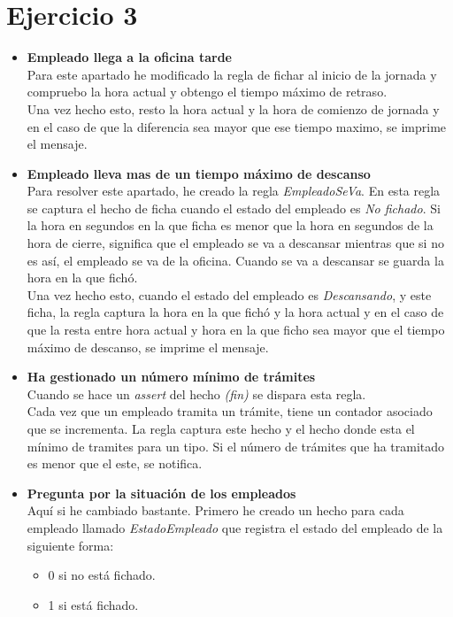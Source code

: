 \documentclass[10pt,spanish]{article}
\begin{document}
	\section{Ejercicio 3}
	\begin{itemize}
		\item \textbf{Empleado llega a la oficina tarde}\\
		Para este apartado he modificado la regla de fichar al inicio de la jornada y compruebo la hora actual y obtengo el tiempo máximo de retraso.\\
		Una vez hecho esto, resto la hora actual y la hora de comienzo de jornada y en el caso de que la diferencia sea mayor que ese tiempo maximo, se imprime el mensaje.
		\item \textbf{Empleado lleva mas de un tiempo máximo de descanso}\\
		Para resolver este apartado, he creado la regla \textit{EmpleadoSeVa}. En esta regla se captura el hecho de ficha cuando el estado del empleado es \textit{No fichado}.
		Si la hora en segundos en la que ficha es menor que la hora en segundos de la hora de cierre, significa que el empleado se va a descansar mientras que si no es así, el empleado se va de la oficina. Cuando se va a descansar se guarda la hora en la que fichó.
		\\Una vez hecho esto, cuando el estado del empleado es \textit{Descansando}, y este ficha, la regla captura la hora en la que fichó y la hora actual y en el caso de que la resta entre hora actual y hora en la que ficho sea mayor que el tiempo máximo de descanso, se imprime el mensaje.
		\item \textbf{Ha gestionado un número mínimo de trámites}\\
		Cuando se hace un \textit{assert} del hecho \textit{(fin)} se dispara esta regla.\\
		Cada vez que un empleado tramita un trámite, tiene un contador asociado que se incrementa.
		La regla captura este hecho y el hecho donde esta el mínimo de tramites para un tipo. Si el número de trámites que ha tramitado es menor que el este, se notifica.
		\item \textbf{Pregunta por la situación de los empleados}\\
		Aquí si he cambiado bastante. Primero he creado un hecho para cada empleado llamado \textit{EstadoEmpleado} que registra el estado del empleado de la siguiente forma:
		\begin{itemize}
			\item 0 si no está fichado.
			\item 1 si está fichado.

\end{itemize}
\end{itemize}
\end{document}
